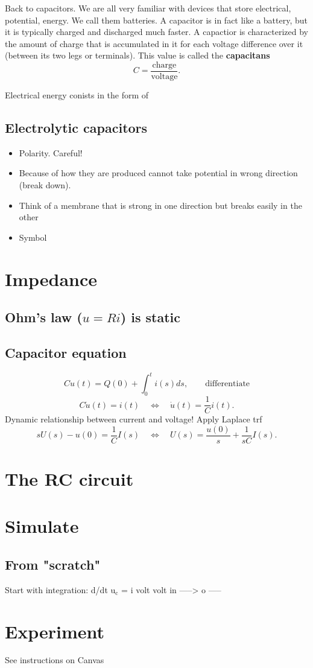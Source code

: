\documentclass[a4paper]{scrartcl}
\begin{document}
Back to capacitors. We are all very familiar with devices that store electrical, potential, energy. We call them batteries. A capacitor is in fact like a battery, but it is typically charged and discharged much faster. A capactior is characterized by the amount of charge that is accumulated in it for each voltage difference over it (between its two legs or terminals). This value is called the \textbf{capacitans}
\[ C = \frac{\text{charge}}{\text{voltage}}. \]



Electrical energy conists in the form of
\subsection{Electrolytic capacitors}
\label{sec-2-2}
\begin{itemize}
\item Polarity. Careful!
\item Because of how they are produced cannot take potential in wrong direction (break down).
\item Think of a membrane that is strong in one direction but breaks easily in the other
\item Symbol
\end{itemize}

\section{Impedance}
\label{sec-3}

\subsection{Ohm's law (\(u=Ri\)) is static}
\label{sec-3-1}

\subsection{Capacitor equation}
\label{sec-3-2}
\[ Cu(t) = Q(0) + \int_0^t i(s) ds, \qquad \text{differentiate}\]
\[ C \dot{u}(t) = i(t) \quad \Leftrightarrow \quad \dot{u}(t) = \frac{1}{C} i(t). \]
Dynamic relationship between current and voltage! Apply Laplace trf
\[ sU(s) - u(0) = \frac{1}{C} I(s) \quad \Leftrightarrow \quad U(s) = \frac{u(0)}{s} + \frac{1}{sC} I(s). \]




\section{The RC circuit}
\label{sec-4}

\section{Simulate}
\label{sec-5}

\subsection{From "scratch"}
\label{sec-5-1}
   Start with integration:  d/dt u$_{\text{c}}$ =  i
                  volt
volt in -----> o -----
\section{Experiment}
\label{sec-6}
See instructions on Canvas
\end{document}
